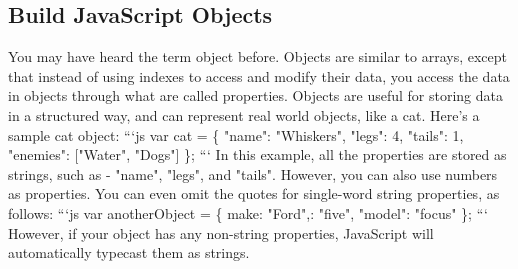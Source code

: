 \documentclass{article}%
\begin{document}
\subsection{Build JavaScript Objects}%
\label{subsec:BuildJavaScriptObjects}%
You may have heard the term object before.\newline%
Objects are similar to arrays, except that instead of using indexes to access and modify their data, you access the data in objects through what are called properties.\newline%
Objects are useful for storing data in a structured way, and can represent real world objects, like a cat.\newline%
Here's a sample cat object:\newline%
```js\newline%
var cat = \{\newline%
  "name": "Whiskers",\newline%
  "legs": 4,\newline%
  "tails": 1,\newline%
  "enemies": {[}"Water", "Dogs"{]}\newline%
\};\newline%
```\newline%
In this example, all the properties are stored as strings, such as {-} "name", "legs", and "tails". However, you can also use numbers as properties. You can even omit the quotes for single{-}word string properties, as follows:\newline%
```js\newline%
var anotherObject = \{\newline%
  make: "Ford",: "five",\newline%
  "model": "focus"\newline%
\};\newline%
```\newline%
However, if your object has any non{-}string properties, JavaScript will automatically typecast them as strings.\newline%

%
\end{document}
